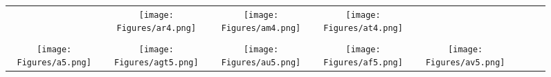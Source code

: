 \documentclass[journal]{IEEEtran}
\begin{document}
\begin{figure*}[!t]
\begin{tabular}{cccccccc}
		&
		\hspace{0.4cm}
		\begin{minipage}{30pt}
			\texttt{[image: Figures/ar4.png]}
\end{minipage}
		&
		\hspace{0.4cm}
		\begin{minipage}{30pt}
			\texttt{[image: Figures/am4.png]}
\end{minipage}
		&
		\hspace{0.4cm}
		\begin{minipage}{30pt}
			\texttt{[image: Figures/at4.png]}
\end{minipage}
		\\
		\\
		\begin{minipage}{30pt}
			\texttt{[image: Figures/a5.png]}
\end{minipage}
		&
		\hspace{0.4cm}
		\begin{minipage}{30pt}
			\texttt{[image: Figures/agt5.png]}
\end{minipage}
		&
		\hspace{0.4cm}
		\begin{minipage}{30pt}
			\texttt{[image: Figures/au5.png]}
\end{minipage}
		&
		\hspace{0.4cm}
		\begin{minipage}{30pt}
			\texttt{[image: Figures/af5.png]}
\end{minipage}
		&
		\hspace{0.4cm}
		\begin{minipage}{30pt}
			\texttt{[image: Figures/av5.png]}
\end{minipage}
	

\end{tabular}
\end{figure*}
\end{document}
